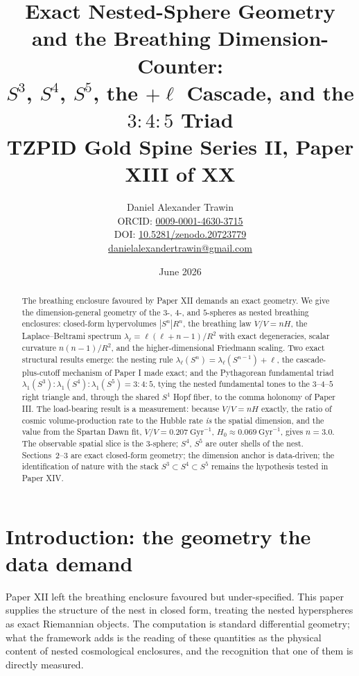 \documentclass[11pt]{article}
\title{Exact Nested-Sphere Geometry and the Breathing Dimension-Counter:\\ $S^3$, $S^4$, $S^5$, the $+\ell$ Cascade, and the $3{:}4{:}5$ Triad\\[0.6em]
\large TZPID Gold Spine Series II, Paper XIII of XX}
\author{Daniel Alexander Trawin\\
\small ORCID: \href{https://orcid.org/0009-0001-4630-3715}{0009-0001-4630-3715}\\
\small DOI: \href{https://doi.org/10.5281/zenodo.20723779}{10.5281/zenodo.20723779}\\
\small \href{mailto:danielalexandertrawin@gmail.com}{danielalexandertrawin@gmail.com}}
\date{June 2026}
\theoremstyle{remark}
\begin{document}
\maketitle
\begin{abstract}
The breathing enclosure favoured by Paper XII demands an exact geometry. We give the dimension-general geometry of the $3$-, $4$-, and $5$-spheres as nested breathing enclosures: closed-form hypervolumes $|S^n| R^n$, the breathing law $\dot V/V = nH$, the Laplace--Beltrami spectrum $\lambda_\ell = \ell(\ell+n-1)/R^2$ with exact degeneracies, scalar curvature $n(n-1)/R^2$, and the higher-dimensional Friedmann scaling. Two exact structural results emerge: the nesting rule $\lambda_\ell(S^n) = \lambda_\ell(S^{n-1}) + \ell$, the cascade-plus-cutoff mechanism of Paper I made exact; and the Pythagorean fundamental triad $\lambda_1(S^3):\lambda_1(S^4):\lambda_1(S^5) = 3:4:5$, tying the nested fundamental tones to the $3$--$4$--$5$ right triangle and, through the shared $S^1$ Hopf fiber, to the comma holonomy of Paper III. The load-bearing result is a measurement: because $\dot V/V = nH$ exactly, the ratio of cosmic volume-production rate to the Hubble rate \emph{is} the spatial dimension, and the value from the Spartan Dawn fit, $\dot V/V = 0.207\ \mathrm{Gyr}^{-1}$, $H_0 \approx 0.069\ \mathrm{Gyr}^{-1}$, gives $n = 3.0$. The observable spatial slice is the $3$-sphere; $S^4$, $S^5$ are outer shells of the nest. Sections~2--3 are exact closed-form geometry; the dimension anchor is data-driven; the identification of nature with the stack $S^3 \subset S^4 \subset S^5$ remains the hypothesis tested in Paper XIV.
\end{abstract}
\section{Introduction: the geometry the data demand}
Paper XII left the breathing enclosure favoured but under-specified. This paper supplies the structure of the nest in closed form, treating the nested hyperspheres as exact Riemannian objects. The computation is standard differential geometry; what the framework adds is the reading of these quantities as the physical content of nested cosmological enclosures, and the recognition that one of them is directly measured.
\end{document}
